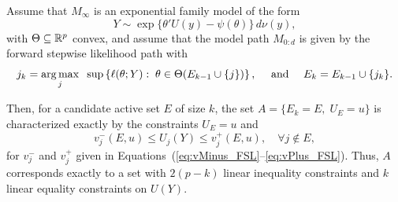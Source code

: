 \documentclass{article}
\begin{document}
\begin{theorem}
  Assume that $M_\infty$ is an exponential family model
  of the form
  \[
  Y \sim \exp\{ \theta'U(y) - \psi(\theta) \}\,d\nu(y),
  \]
  with $\Theta \subseteq \mathbb{R}^p$ convex, and assume that the model path $M_{0:d}$ is given by the forward stepwise likelihood path with
\begin{equation}
j_k = \operatorname*{arg\,max}_j \;\;\sup \left\{\ell(\theta; Y):\; \theta\in\Theta(E_{k-1} \cup \{j\})\right\}, \quad \text{ and } \quad
E_k = E_{k-1} \cup \{j_k\}.
\end{equation}

  Then, for a candidate active set $E$ of size $k$, the set $A = \{E_k = E, \;U_E = u\}$ is characterized exactly by the constraints $U_E = u$ and
  \[
  v_j^-(E,u) \leq U_j(Y) \leq v_j^+(E,u), \quad\forall j \notin E,
  \]
  for $v_j^-$ and $v_j^+$ given in Equations~(\ref{eq:vMinus_FSL}--\ref{eq:vPlus_FSL}).
  Thus, $A$ corresponds exactly to a set with $2(p-k)$ linear inequality constraints and $k$ linear equality constraints on $U(Y)$.
\end{theorem}
\end{document}
